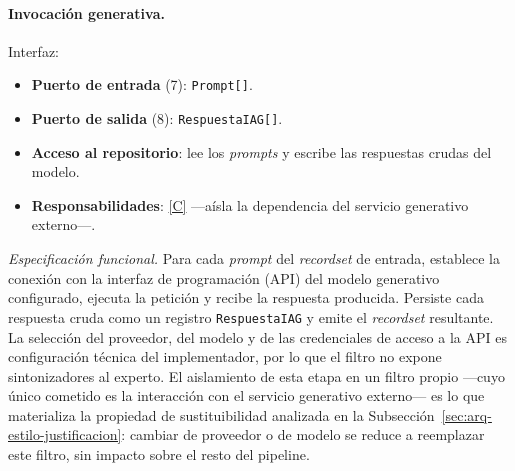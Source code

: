 \documentclass[12pt]{report}
\DeclareRobustCommand{\resp}[1]{\hyperref[tab:registro-responsabilidades]{\textcolor{respcolor}{[#1]}}}
\begin{document}
\paragraph{Invocación generativa.} Interfaz:
\begin{itemize}
  \item \textbf{Puerto de entrada} (7): \texttt{Prompt[]}.
  \item \textbf{Puerto de salida} (8): \texttt{RespuestaIAG[]}.
  \item \textbf{Acceso al repositorio}: lee los \textit{prompts} y escribe las respuestas crudas del modelo.
  \item \textbf{Responsabilidades}: \resp{C} ---aísla la dependencia del servicio generativo externo---.
\end{itemize}
\textit{Especificación funcional.} Para cada \textit{prompt} del \textit{recordset} de entrada, establece la conexión con la interfaz de programación (API) del modelo generativo configurado, ejecuta la petición y recibe la respuesta producida. Persiste cada respuesta cruda como un registro \texttt{RespuestaIAG} y emite el \textit{recordset} resultante. La selección del proveedor, del modelo y de las credenciales de acceso a la API es configuración técnica del implementador, por lo que el filtro no expone sintonizadores al experto. El aislamiento de esta etapa en un filtro propio ---cuyo único cometido es la interacción con el servicio generativo externo--- es lo que materializa la propiedad de sustituibilidad analizada en la Subsección~\ref{sec:arq-estilo-justificacion}: cambiar de proveedor o de modelo se reduce a reemplazar este filtro, sin impacto sobre el resto del pipeline.
\end{document}
